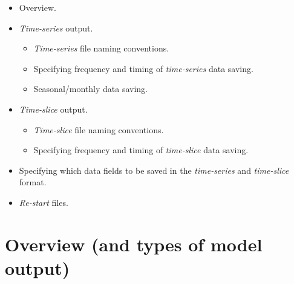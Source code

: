 \documentclass[11pt,fleqn]{book} %
\begin{document}
\begin{itemize}
        \item Overview.
        \item \textit{Time-series} output.
        \begin{itemize}
                \item \textit{Time-series} file naming conventions.
                \item Specifying frequency and timing of \textit{time-series} data saving.
                \item Seasonal/monthly data saving.
        \end{itemize}
        \item \textit{Time-slice} output.
        \begin{itemize}
                \item \textit{Time-slice} file naming conventions.
                \item Specifying frequency and timing of \textit{time-slice} data saving.
        \end{itemize}
        \item Specifying which data fields to be saved in the \textit{time-series} and \textit{time-slice} format.
        \item \textit{Re-start} files.
\end{itemize}


\newpage


\section{Overview (and types of model output)}
\end{document}
